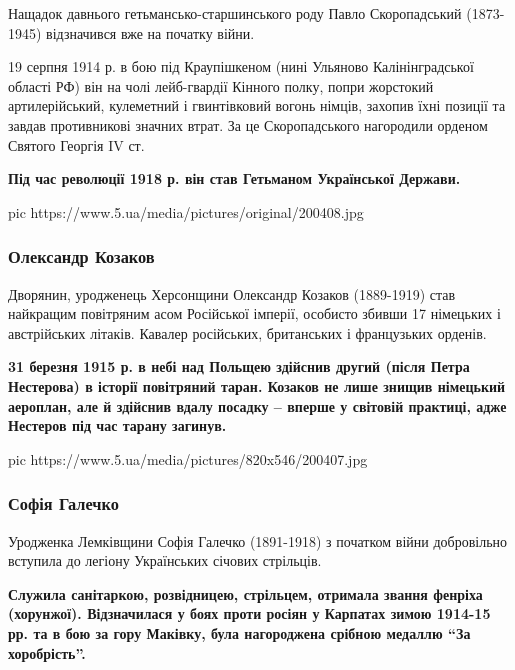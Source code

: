 Нащадок давнього гетьмансько-старшинського роду Павло Скоропадський
(1873-1945) відзначився вже на початку війни.

19 серпня 1914 р. в бою під Краупішкеном (нині Ульяново Калінінградської
області РФ) він на чолі лейб-гвардії Кінного полку, попри жорстокий
артилерійський, кулеметний і гвинтівковий вогонь німців, захопив їхні
позиції та завдав противникові значних втрат. За це Скоропадського
нагородили орденом Святого Георгія IV ст.

\begin{leftbar}
	\bfseries
Під час революції 1918 р. він став Гетьманом Української Держави.
\end{leftbar}

\ifcmt
pic https://www.5.ua/media/pictures/original/200408.jpg
\fi

\subsubsection{Олександр Козаков}

Дворянин, уродженець Херсонщини Олександр Козаков (1889-1919) став
найкращим повітряним асом Російської імперії, особисто збивши 17 німецьких
і австрійських літаків. Кавалер російських, британських і французьких
орденів.

\begin{leftbar}
	\bfseries
31 березня 1915 р. в небі над Польщею здійснив другий (після Петра
Нестерова) в історії повітряний таран. Козаков не лише знищив німецький
аероплан, але й здійснив вдалу посадку – вперше у світовій практиці,
адже Нестеров під час тарану загинув.
\end{leftbar}

\ifcmt
pic https://www.5.ua/media/pictures/820x546/200407.jpg
\fi

\subsubsection{Софія Галечко}

Уродженка Лемківщини Софія Галечко (1891-1918) з початком війни
добровільно вступила до легіону Українських січових стрільців.

\begin{leftbar}
	\bfseries
Служила санітаркою, розвідницею, стрільцем, отримала звання фенріха
(хорунжої). Відзначилася у боях проти росіян у Карпатах зимою 1914-15
рр. та в бою за гору Маківку, була нагороджена срібною медаллю \enquote{За
хоробрість}.
\end{leftbar}

